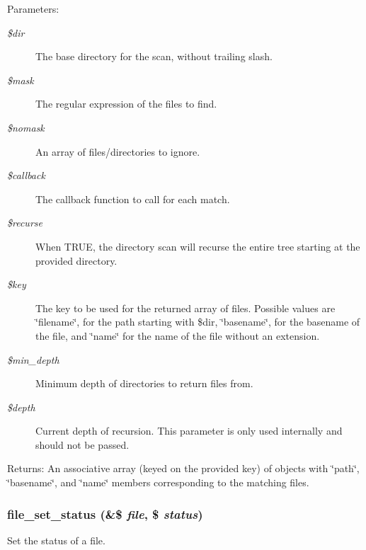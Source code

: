 \begin{Desc}
\item[Parameters:]
\begin{description}
\item[{\em \$dir}]The base directory for the scan, without trailing slash. \item[{\em \$mask}]The regular expression of the files to find. \item[{\em \$nomask}]An array of files/directories to ignore. \item[{\em \$callback}]The callback function to call for each match. \item[{\em \$recurse}]When TRUE, the directory scan will recurse the entire tree starting at the provided directory. \item[{\em \$key}]The key to be used for the returned array of files. Possible values are \char`\"{}filename\char`\"{}, for the path starting with \$dir, \char`\"{}basename\char`\"{}, for the basename of the file, and \char`\"{}name\char`\"{} for the name of the file without an extension. \item[{\em \$min\_\-depth}]Minimum depth of directories to return files from. \item[{\em \$depth}]Current depth of recursion. This parameter is only used internally and should not be passed.\end{description}
\end{Desc}
\begin{Desc}
\item[Returns:]An associative array (keyed on the provided key) of objects with \char`\"{}path\char`\"{}, \char`\"{}basename\char`\"{}, and \char`\"{}name\char`\"{} members corresponding to the matching files. \end{Desc}
\hypertarget{group__file_g68a0e6728e47cf2f9d543a0002ff3f49}{
\subsubsection[{file\_\-set\_\-status}]{\setlength{\rightskip}{0pt plus 5cm}file\_\-set\_\-status (\&\$ {\em file}, \/  \$ {\em status})}}
\label{group__file_g68a0e6728e47cf2f9d543a0002ff3f49}


Set the status of a file.

